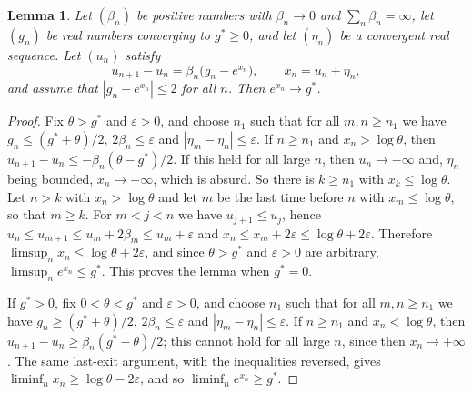 \documentclass[11pt]{amsart}
\newtheorem{lemma}[theorem]{Lemma}
\theoremstyle{remark}
\begin{document}
\begin{lemma}\label{lem:det}
Let $(\beta_n)$ be positive numbers with $\beta_n\to0$ and $\sum_n\beta_n=\infty$, let $(g_n)$ be real numbers
converging to $g^*\ge0$, and let $(\eta_n)$ be a convergent real sequence. Let $(u_n)$ satisfy
\[
u_{n+1}-u_n=\beta_n\bigl(g_n-e^{x_n}\bigr),\qquad x_n=u_n+\eta_n,
\]
and assume that $|g_n-e^{x_n}|\le2$ for all $n$. Then $e^{x_n}\to g^*$.
\end{lemma}
\begin{proof}
Fix $\theta>g^*$ and $\varepsilon>0$, and choose $n_1$ such that for all $m,n\ge n_1$ we have $g_n\le(g^*+\theta)/2$,
$2\beta_n\le\varepsilon$ and $|\eta_m-\eta_n|\le\varepsilon$. If $n\ge n_1$ and $x_n>\log\theta$, then
$u_{n+1}-u_n\le-\beta_n(\theta-g^*)/2$. If this held for all large $n$, then $u_n\to-\infty$ and, $\eta_n$ being
bounded, $x_n\to-\infty$, which is absurd. So there is $k\ge n_1$ with $x_k\le\log\theta$. Let $n>k$ with
$x_n>\log\theta$ and let $m$ be the last time before $n$ with $x_m\le\log\theta$, so that $m\ge k$. For $m<j<n$ we
have $u_{j+1}\le u_j$, hence $u_n\le u_{m+1}\le u_m+2\beta_m\le u_m+\varepsilon$ and
$x_n\le x_m+2\varepsilon\le\log\theta+2\varepsilon$. Therefore $\limsup_nx_n\le\log\theta+2\varepsilon$, and since
$\theta>g^*$ and $\varepsilon>0$ are arbitrary, $\limsup_ne^{x_n}\le g^*$. This proves the lemma when $g^*=0$.

If $g^*>0$, fix $0<\theta<g^*$ and $\varepsilon>0$, and choose $n_1$ such that for all $m,n\ge n_1$ we have
$g_n\ge(g^*+\theta)/2$, $2\beta_n\le\varepsilon$ and $|\eta_m-\eta_n|\le\varepsilon$. If $n\ge n_1$ and
$x_n<\log\theta$, then $u_{n+1}-u_n\ge\beta_n(g^*-\theta)/2$; this cannot hold for all large $n$, since then
$x_n\to+\infty$. The same last-exit argument, with the inequalities reversed, gives
$\liminf_nx_n\ge\log\theta-2\varepsilon$, and so $\liminf_ne^{x_n}\ge g^*$.
\end{proof}
\end{document}
